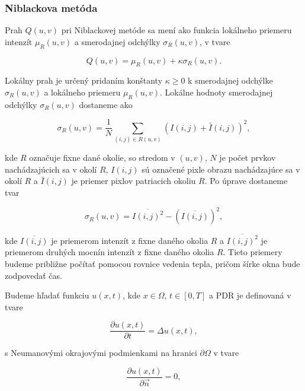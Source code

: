 \documentclass[a4paper,11pt,oneside]{article}%
\begin{document}
\subsubsection{Niblackova metóda} \label{niblack} 

Prah $Q(u, v)$ pri Niblackovej metóde sa mení ako funkcia lokálneho priemeru intenzít $\mu_R(u,v)$ a smerodajnej odchýlky $\sigma_R(u,v)$, v tvare

\begin{equation} \label{eq:nbO}
Q(u,v) = \mu_R(u,v) + \kappa\sigma_R(u,v).
\end{equation}

Lokálny prah je určený pridaním konštanty $\kappa \geq 0$ k smerodajnej odchýlke $\sigma_R(u,v)$ a lokálneho priemeru $\mu_R(u,v)$. Lokálne hodnoty smerodajnej odchýlky $\sigma_R(u,v)$ dostaneme ako 

\begin{equation} 
\sigma_R(u,v) = \frac{1}{N} \sum_{(i,j) \in R(u,v)} (I(i,j) + \bar{I}(i,j))^2,
\end{equation}

kde $R$ označuje fixne dané okolie, so stredom v $(u,v)$, $N$ je počet prvkov nachádzajúcich sa v okolí $R$, $I(i,j)$ sú označené pixle obrazu nachádzajúce sa v okolí $R$ a $\bar{I}(i,j)$ je priemer pixlov patriacich okoliu $R$. Po úprave dostaneme tvar

\begin{equation} 
\sigma_R(u,v) = \overline{I(i,j)^2} - (\overline{I(i,j)})^2,
\end{equation}

kde $\overline{I(i,j)}$ je priemerom intenzít z fixne daného okolia $R$ a $\overline{I(i,j)^2}$ je priemerom druhých mocnín intenzít z fixne daného okolia $R$. Tieto priemery budeme približne počítať pomocou rovnice vedenia tepla, pričom šírke okna bude zodpovedať čas. 

Budeme hľadať funkciu $u(x, t)$, kde $x \in \Omega$, $t \in [0, T]$ a PDR je definovaná v tvare

\begin{equation}
\frac{\partial u(x, t)}{\partial t} = \Delta u(x,t),
\end{equation}

s Neumanovými okrajovými podmienkami na hranici $\partial \Omega$ v tvare

\begin{equation}
\frac{\partial u(x, t)}{\partial \vec{n}} = 0,
\end{equation}
\end{document}
